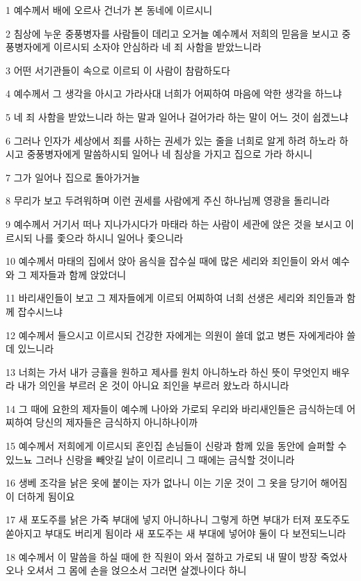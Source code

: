 \par 1 예수께서 배에 오르사 건너가 본 동네에 이르시니
\par 2 침상에 누운 중풍병자를 사람들이 데리고 오거늘 예수께서 저희의 믿음을 보시고 중풍병자에게 이르시되 소자야 안심하라 네 죄 사함을 받았느니라
\par 3 어떤 서기관들이 속으로 이르되 이 사람이 참람하도다
\par 4 예수께서 그 생각을 아시고 가라사대 너희가 어찌하여 마음에 악한 생각을 하느냐
\par 5 네 죄 사함을 받았느니라 하는 말과 일어나 걸어가라 하는 말이 어느 것이 쉽겠느냐
\par 6 그러나 인자가 세상에서 죄를 사하는 권세가 있는 줄을 너희로 알게 하려 하노라 하시고 중풍병자에게 말씀하시되 일어나 네 침상을 가지고 집으로 가라 하시니
\par 7 그가 일어나 집으로 돌아가거늘
\par 8 무리가 보고 두려워하며 이런 권세를 사람에게 주신 하나님께 영광을 돌리니라
\par 9 예수께서 거기서 떠나 지나가시다가 마태라 하는 사람이 세관에 앉은 것을 보시고 이르시되 나를 좇으라 하시니 일어나 좇으니라
\par 10 예수께서 마태의 집에서 앉아 음식을 잡수실 때에 많은 세리와 죄인들이 와서 예수와 그 제자들과 함께 앉았더니
\par 11 바리새인들이 보고 그 제자들에게 이르되 어찌하여 너희 선생은 세리와 죄인들과 함께 잡수시느냐
\par 12 예수께서 들으시고 이르시되 건강한 자에게는 의원이 쓸데 없고 병든 자에게라야 쓸데 있느니라
\par 13 너희는 가서 내가 긍휼을 원하고 제사를 원치 아니하노라 하신 뜻이 무엇인지 배우라 내가 의인을 부르러 온 것이 아니요 죄인을 부르러 왔노라 하시니라
\par 14 그 때에 요한의 제자들이 예수께 나아와 가로되 우리와 바리새인들은 금식하는데 어찌하여 당신의 제자들은 금식하지 아니하나이까
\par 15 예수께서 저희에게 이르시되 혼인집 손님들이 신랑과 함께 있을 동안에 슬퍼할 수 있느뇨 그러나 신랑을 빼앗길 날이 이르리니 그 때에는 금식할 것이니라
\par 16 생베 조각을 낡은 옷에 붙이는 자가 없나니 이는 기운 것이 그 옷을 당기어 해어짐이 더하게 됨이요
\par 17 새 포도주를 낡은 가죽 부대에 넣지 아니하나니 그렇게 하면 부대가 터져 포도주도 쏟아지고 부대도 버리게 됨이라 새 포도주는 새 부대에 넣어야 둘이 다 보전되느니라
\par 18 예수께서 이 말씀을 하실 때에 한 직원이 와서 절하고 가로되 내 딸이 방장 죽었사 오나 오셔서 그 몸에 손을 얹으소서 그러면 살겠나이다 하니
